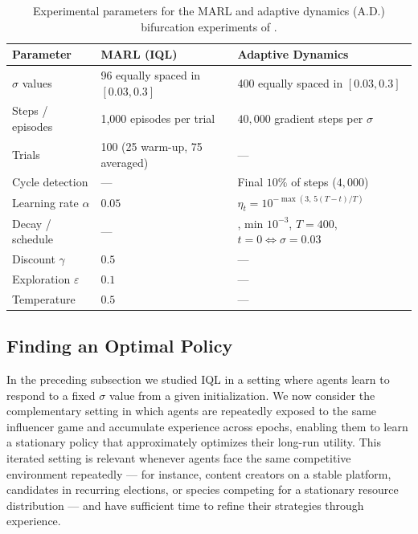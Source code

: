 \documentclass{article}
\begin{document}
            \begin{table}[ht!]
                \centering
                \caption{Experimental parameters for the MARL and adaptive dynamics (A.D.) bifurcation experiments of .}
                \label{tab:SI_marl_bifurcation_params}
                \begin{tabular}{lll}
                    \toprule
                    Parameter & MARL (IQL) & Adaptive Dynamics \\
                    \midrule
                    $\sigma$ values & 96 equally spaced in $[0.03, 0.3]$ & 400 equally spaced in $[0.03, 0.3]$ \\
                    Steps / episodes & 1{,}000 episodes per trial & $40{,}000$ gradient steps per $\sigma$ \\
                    Trials & 100 (25 warm-up, 75 averaged) & --- \\
                    Cycle detection & --- & Final $10\%$ of steps ($4{,}000$) \\
                    Learning rate $\alpha$ & $0.05$ & $\eta_t = 10^{-\max(3,\,5(T-t)/T)}$ \\
                    Decay / schedule & --- &, min $10^{-3}$, $T=400$, $t=0 \Leftrightarrow \sigma=0.03$ \\
                    Discount $\gamma$ & $0.5$ & --- \\
                    Exploration $\varepsilon$ & $0.1$ & --- \\
                    Temperature & $0.5$ & --- \\
                    \bottomrule
                \end{tabular}
            \end{table}
        \clearpage
        \subsection{Finding an Optimal Policy}\label{subsec:SI_optimal_policy}

            In the preceding subsection we studied IQL in a setting where agents learn to respond to a fixed $\sigma$ value from a given initialization. We now consider the complementary setting in which agents are repeatedly exposed to the same influencer game and accumulate experience across epochs, enabling them to learn a stationary policy that approximately optimizes their long-run utility. This iterated setting is relevant whenever agents face the same competitive environment repeatedly --- for instance, content creators on a stable platform, candidates in recurring elections, or species competing for a stationary resource distribution --- and have sufficient time to refine their strategies through experience.
\end{document}
